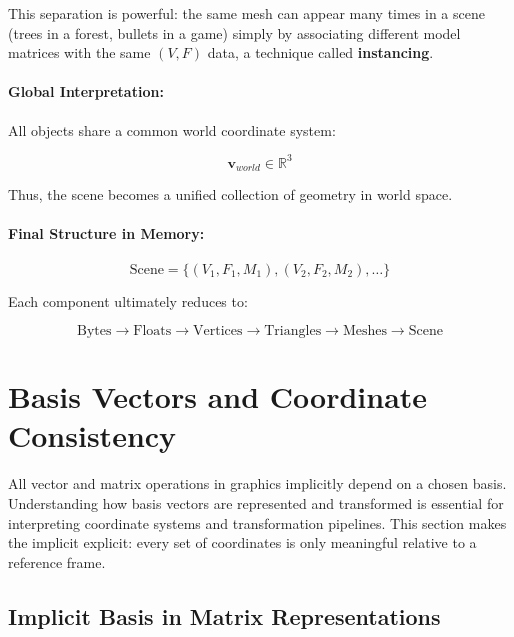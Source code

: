 \documentclass[11pt]{article}
\begin{document}
This separation is powerful: the same mesh can appear many times in a scene (trees in a forest, bullets in a game) simply by associating different model matrices with the same $(V, F)$ data, a technique called \textbf{instancing}.

\paragraph{Global Interpretation:}

All objects share a common world coordinate system:

\begin{equation}
    \mathbf{v}_{world} \in \mathbb{R}^3
\end{equation}

Thus, the scene becomes a unified collection of geometry in world space.

\paragraph{Final Structure in Memory:}

\begin{equation}
    \text{Scene} =
    \big\{
    (V_1, F_1, M_1),
    (V_2, F_2, M_2),
    \dots
    \big\}
\end{equation}

Each component ultimately reduces to:

\begin{equation}
    \text{Bytes} \rightarrow \text{Floats} \rightarrow \text{Vertices} \rightarrow \text{Triangles} \rightarrow \text{Meshes} \rightarrow \text{Scene}
\end{equation}

\section{Basis Vectors and Coordinate Consistency}

All vector and matrix operations in graphics implicitly depend on a chosen basis. Understanding how basis vectors are represented and transformed is essential for interpreting coordinate systems and transformation pipelines. This section makes the implicit explicit: every set of coordinates is only meaningful relative to a reference frame.

\subsection{Implicit Basis in Matrix Representations}
\end{document}
